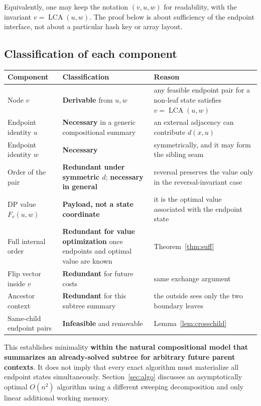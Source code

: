 \documentclass[11pt]{article}
\theoremstyle{plain}
\newcommand{\LCA}{\operatorname{LCA}}
\begin{document}
Equivalently, one may keep the notation \((v,u,w)\) for readability, with the
invariant \(v=\LCA(u,w)\). The proof below is about sufficiency of the endpoint
interface, not about a particular hash key or array layout.

\subsection{Classification of each component}

\begin{center}
\renewcommand{\arraystretch}{1.35}
\begin{tabular}{@{}l l p{7.6cm}@{}}
\toprule
Component & Classification & Reason \\
\midrule
Node \(v\) & \textbf{Derivable} from \(u,w\) & any feasible endpoint pair for
a non-leaf state satisfies \(v=\LCA(u,w)\) \\
Endpoint identity \(u\) & \textbf{Necessary} in a generic compositional
summary & an external adjacency can contribute \(d(x,u)\) \\
Endpoint identity \(w\) & \textbf{Necessary} & symmetrically, and it may form
the sibling seam \\
Order of the pair & \textbf{Redundant under symmetric \(d\)}; \textbf{necessary
in general} & reversal preserves the value only in the reversal-invariant case
\\
DP value \(F_v(u,w)\) & \textbf{Payload, not a state coordinate} & it is the
optimal value associated with the endpoint state \\
Full internal order & \textbf{Redundant for value optimization} once endpoints
and optimal value are known & Theorem~\ref{thm:suff} \\
Flip vector inside \(v\) & \textbf{Redundant} for future costs & same exchange
argument \\
Ancestor context & \textbf{Redundant} for this subtree summary & the outside
sees only the two boundary leaves \\
Same-child endpoint pairs & \textbf{Infeasible} and removable &
Lemma~\ref{lem:crosschild} \\
\bottomrule
\end{tabular}
\end{center}

This establishes minimality \textbf{within the natural compositional model
that summarizes an already-solved subtree for arbitrary future parent
contexts}. It does not imply that every exact algorithm must materialize all
endpoint states simultaneously. Section~\ref{sec:algo} discusses an
asymptotically optimal \(O(n^2)\) algorithm using a different sweeping
decomposition and only linear additional working memory.
\end{document}

